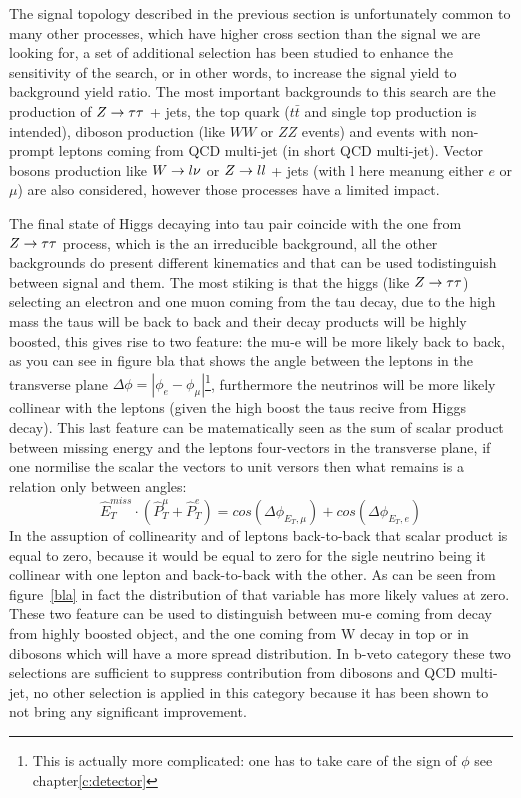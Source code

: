 The signal topology described in the previous section is unfortunately 
common to many other processes, which have higher cross section than the signal we are looking for,
a set of additional selection has been studied to enhance the sensitivity of the search, or in other words,
to increase the signal yield to background yield ratio. The most important backgrounds to this search are the production of
 $Z\rightarrow \tau\tau $ + jets, the top quark ($t\bar{t}$ and single top production is intended), diboson production 
(like $WW$ or $ZZ$ events) and events with non-prompt leptons coming from QCD multi-jet (in short QCD multi-jet).
Vector bosons production like  $W\rightarrow l\nu$ or $Z\rightarrow ll$ + jets (with l here meanung either $e$ or $\mu$) are also considered,
however those processes have a limited impact.

The final state of Higgs decaying into tau pair coincide with the one from  $Z\rightarrow \tau\tau$  process, which is the an irreducible 
background, all the other backgrounds do present different kinematics and %
that can be used todistinguish between signal and them.
The most stiking is that the higgs (like $Z\rightarrow \tau\tau$) selecting an electron and one muon
coming from the tau decay, due to the high mass the taus will be back to back and their decay products will be highly boosted,
this gives rise to two feature: the mu-e will be more likely back to back, as you can see in figure bla that shows the angle between the
leptons in the transverse plane 
$\Delta\phi = |\phi_{e} - \phi_{\mu}| $\footnote{This is actually more complicated: one has to take care of the sign of $\phi$ see chapter\ref{c:detector}},
furthermore the neutrinos will be more likely collinear with the leptons (given the high boost the taus recive from Higgs decay).
This last feature can be matematically seen as the sum of scalar product between missing energy and the leptons four-vectors in the
transverse plane, if one normilise the scalar the vectors to unit versors then what remains is a relation only between angles:
$$ \hat{E}_{T}^{miss} \cdot ( \hat{P}_{T}^{\mu} + \hat{P}_{T}^{e} ) = cos(\Delta\phi_{E_{T},\mu}) + cos(\Delta\phi_{E_{T},e})  $$
In the assuption of collinearity and of leptons back-to-back that scalar product  is equal to zero, because it would be equal 
to zero for the sigle neutrino being it collinear with one lepton and back-to-back with the other.
As can be seen from figure~\ref{bla} in fact the distribution of that variable 
has more likely values at zero. These two feature can be used to distinguish between mu-e coming from decay from highly 
boosted object, and the one coming from W decay in top or in dibosons which will have a more spread distribution.
In b-veto category these two selections are sufficient to suppress contribution from dibosons and QCD multi-jet,
no other selection is applied in this category because it has been shown to not bring any significant improvement.

